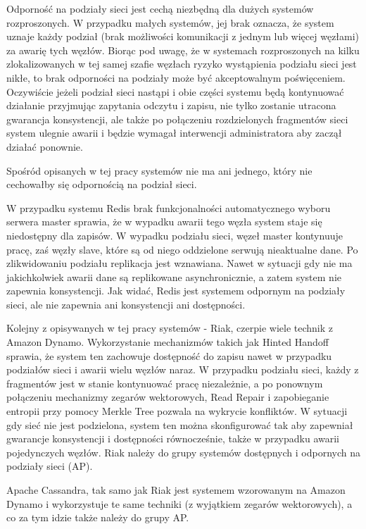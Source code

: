 Odporność na podziały sieci jest cechą niezbędną dla dużych systemów rozproszonych.
W przypadku małych systemów, jej brak oznacza, że system uznaje każdy podział (brak możliwości komunikacji z jednym lub więcej węzłami) za awarię tych węzłów.
Biorąc pod uwagę, że w systemach rozproszonych na kilku zlokalizowanych w tej samej szafie węzłach ryzyko wystąpienia podziału sieci jest nikłe, to brak odporności na podziały może być akceptowalnym poświęceniem.
Oczywiście jeżeli podział sieci nastąpi i obie części systemu będą kontynuować działanie przyjmując zapytania odczytu i zapisu, nie tylko zostanie utracona gwarancja konsystencji, ale także po połączeniu rozdzielonych fragmentów sieci system ulegnie awarii i będzie wymagał interwencji administratora aby zaczął działać ponownie.

Spośród opisanych w tej pracy systemów nie ma ani jednego, który nie cechowałby się odpornością na podział sieci.

W przypadku systemu Redis brak funkcjonalności automatycznego wyboru serwera master sprawia, że w wypadku awarii tego węzła system staje się niedostępny dla zapisów.
W wypadku podziału sieci, węzeł master kontynuuje pracę, zaś węzły slave, które są od niego oddzielone serwują nieaktualne dane.
Po zlikwidowaniu podziału replikacja jest wznawiana.
Nawet w sytuacji gdy nie ma jakichkolwiek awarii dane są replikowane asynchronicznie, a zatem system nie zapewnia konsystencji.
Jak widać, Redis jest systemem odpornym na podziały sieci, ale nie zapewnia ani konsystencji ani dostępności.

Kolejny z opisywanych w tej pracy systemów - Riak, czerpie wiele technik z Amazon Dynamo.
Wykorzystanie mechanizmów takich jak Hinted Handoff sprawia, że system ten zachowuje dostępność do zapisu nawet w przypadku podziałów sieci i awarii wielu węzłów naraz.
W przypadku podziału sieci, każdy z fragmentów jest w stanie kontynuować pracę niezależnie, a po ponownym połączeniu mechanizmy zegarów wektorowych, Read Repair i zapobieganie entropii przy pomocy Merkle Tree pozwala na wykrycie konfliktów.
W sytuacji gdy sieć nie jest podzielona, system ten można skonfigurować tak aby zapewniał gwarancje konsystencji i dostępności równocześnie, także w przypadku awarii pojedynczych węzłów.
Riak należy do grupy systemów dostępnych i odpornych na podziały sieci (AP).

Apache Cassandra, tak samo jak Riak jest systemem wzorowanym na Amazon Dynamo i wykorzystuje te same techniki (z wyjątkiem zegarów wektorowych), a co za tym idzie także należy do grupy AP.

